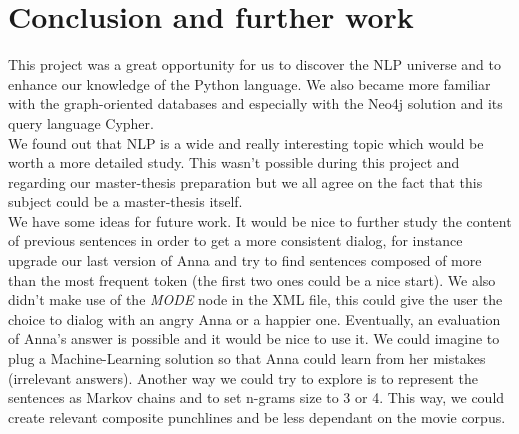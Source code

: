 \section{Conclusion and further work}
This project was a great opportunity for us to discover the NLP universe and to enhance our knowledge of the Python language. We also became more familiar with the graph-oriented databases and especially with the Neo4j solution and its query language Cypher.\\

We found out that NLP is a wide and really interesting topic which would be worth a more detailed study. This wasn't possible during this project and regarding our master-thesis preparation but we all agree on the fact that this subject could be a master-thesis itself.\\

We have some ideas for future work. It would be nice to further study the content of previous sentences in order to get a more consistent dialog, for instance upgrade our last version of Anna and try to find sentences composed of more than the most frequent token (the first two ones could be a nice start). We also didn't make use of the \emph{MODE} node in the XML file, this could give the user the choice to dialog with an angry Anna or a happier one. Eventually, an evaluation of Anna's answer is possible and it would be nice to use it. We could imagine to plug a Machine-Learning solution so that Anna could learn from her mistakes (irrelevant answers).
Another way we could try to explore is to represent the sentences as Markov chains and to set n-grams size to 3 or 4. This way, we could create relevant composite punchlines and be less dependant on the movie corpus.
